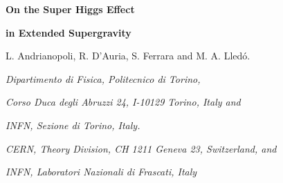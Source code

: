 \documentclass[a4paper,12pt]{article}
\begin{document}

\providecommand{\R}{\mathbb{R}}
\providecommand{\C}{\mathbb{C}}
\providecommand{\Z}{\mathbb{Z}}
\providecommand{\Hb}{\mathbb{H}}
\providecommand{\id}{\relax{\rm 1\kern-.35em 1}}


\providecommand{\rUSp}{\mathrm{USp}}
\providecommand{\rO}{\mathrm{O}}
\providecommand{\rSO}{\mathrm{SO}}
\providecommand{\rSU}{\mathrm{SU}}
\providecommand{\rU}{\mathrm{U}}
\providecommand{\rSL}{\mathrm{SL}}
\providecommand{\rE}{\mathrm{E}}

\providecommand{\fsl}{\mathfrak{sl}}
\providecommand{\fso}{\mathfrak{so}}
\providecommand{\ft}{\mathfrak{t}}

\providecommand{\be}{\mathbf{E}}

\vskip 1.5cm


  \centerline{\LARGE \bf On the  Super Higgs Effect  }

  \bigskip

   \centerline{\LARGE \bf in Extended  Supergravity }





 \vskip 3cm
\centerline{L. Andrianopoli\myHighlight{$^\sharp$}\coordHE{}, R. D'Auria\myHighlight{$^\sharp$}\coordHE{},  S.
Ferrara\myHighlight{$^\flat$}\coordHE{} and M. A. Lled\'o\myHighlight{$^\sharp$}\coordHE{}.}

\vskip 1.5cm



\centerline{\it \myHighlight{$^\sharp$}\coordHE{} Dipartimento di Fisica, Politecnico di
Torino,} \centerline{\it Corso Duca degli Abruzzi 24, I-10129
Torino, Italy and } \centerline{\it   INFN, Sezione di Torino,
Italy. }

\medskip



\centerline{\it \myHighlight{$^\flat$}\coordHE{} CERN, Theory Division, CH 1211 Geneva 23,
Switzerland, and } \centerline{\it INFN, Laboratori Nazionali di
Frascati, Italy}





\vskip 1cm

\begin{abstract}
We consider the reduction of supersymmetry in \coordHE{}-extended four
dimensional supergravity via the super Higgs mechanism in theories
without cosmological constant.
 We provide an analysis largely based on the properties of long and short multiplets of Poincar\'e supersymmetry.
 Examples of the super Higgs phenomenon are realized in spontaneously broken \coordHE{} supergravity through the
  Scherk-Schwarz mechanism and in superstring compactification in presence of brane fluxes. In many models the
   massive vectors count the difference in number of the translation isometries of the scalar \myHighlight{$\sigma$}\coordHE{}-model
    geometries in the broken and unbroken phase.
\end{abstract}
\end{document}
